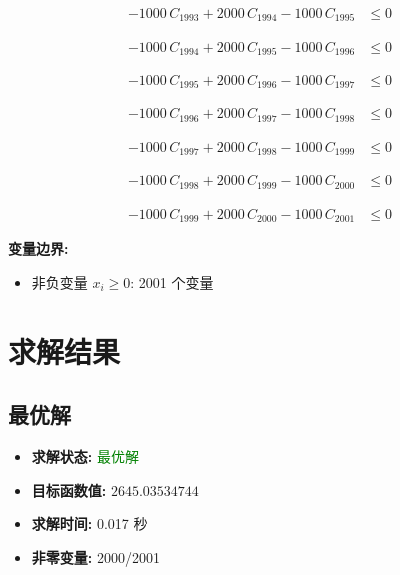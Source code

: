 \documentclass[a4paper,11pt]{article}
\begin{document}
\begin{align}
-1000\,C_{1993} + 2000\,C_{1994} - 1000\,C_{1995} &\leq 0 \nonumber
\end{align}

\begin{align}
-1000\,C_{1994} + 2000\,C_{1995} - 1000\,C_{1996} &\leq 0 \nonumber
\end{align}

\begin{align}
-1000\,C_{1995} + 2000\,C_{1996} - 1000\,C_{1997} &\leq 0 \nonumber
\end{align}

\begin{align}
-1000\,C_{1996} + 2000\,C_{1997} - 1000\,C_{1998} &\leq 0 \nonumber
\end{align}

\begin{align}
-1000\,C_{1997} + 2000\,C_{1998} - 1000\,C_{1999} &\leq 0 \nonumber
\end{align}

\begin{align}
-1000\,C_{1998} + 2000\,C_{1999} - 1000\,C_{2000} &\leq 0 \nonumber
\end{align}

\begin{align}
-1000\,C_{1999} + 2000\,C_{2000} - 1000\,C_{2001} &\leq 0 \nonumber
\end{align}

\textbf{变量边界:}
\begin{itemize}
\item 非负变量 $x_i \geq 0$: 2001 个变量
\end{itemize}

\section{求解结果}

\subsection{最优解}
\begin{itemize}
\item \textbf{求解状态:} \textcolor{green}{最优解}
\item \textbf{目标函数值:} $2645.03534744$
\item \textbf{求解时间:} 0.017 秒
\item \textbf{非零变量:} 2000/2001
\end{itemize}
\end{document}
